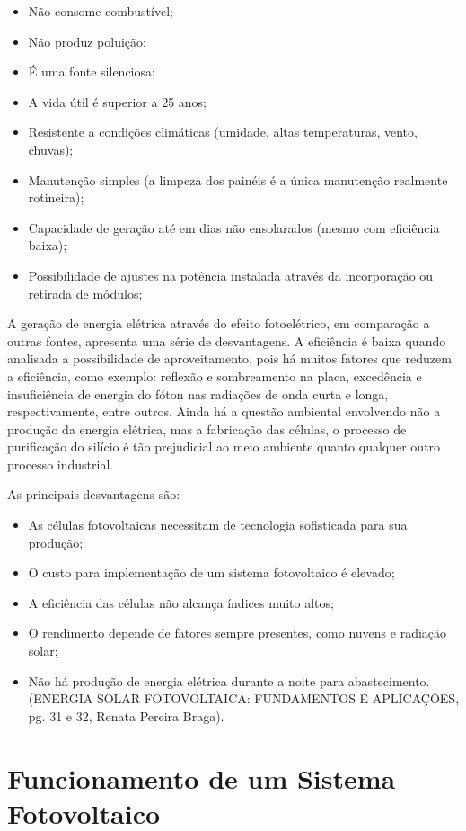\begin{itemize}
	\item Não consome combustível;
	\item Não produz poluição;
	\item É uma fonte silenciosa;
	\item A vida útil é superior a 25 anos;
	\item Resistente a condições climáticas (umidade, altas temperaturas, vento, chuvas);
	\item Manutenção simples (a limpeza dos painéis é a única manutenção realmente rotineira);
	\item Capacidade de geração até em dias não ensolarados (mesmo com eficiência baixa);
	\item Possibilidade de ajustes na potência instalada através da incorporação ou retirada de módulos;
\end{itemize}

A geração de energia elétrica através do efeito fotoelétrico, em comparação a outras fontes, apresenta uma série de desvantagens. A eficiência é baixa quando analisada a possibilidade de aproveitamento, pois há muitos fatores que reduzem a eficiência, como exemplo: reflexão e sombreamento na placa, excedência e insuficiência de energia do fóton nas radiações de onda curta e longa, respectivamente, entre outros. Ainda há a questão ambiental envolvendo não a produção da energia elétrica, mas a fabricação das células, o processo de purificação do silício é tão prejudicial ao meio ambiente quanto qualquer outro processo industrial.

As principais desvantagens são:

\begin{itemize}
	\item As células fotovoltaicas necessitam de tecnologia sofisticada para sua produção;
	\item O custo para implementação de um sistema fotovoltaico é elevado;
	\item A eficiência das células não alcança índices muito altos;
	\item O rendimento depende de fatores sempre presentes, como nuvens e radiação solar;
	\item Não há produção de energia elétrica durante a noite para abastecimento. (ENERGIA SOLAR FOTOVOLTAICA: FUNDAMENTOS E APLICAÇÕES, pg. 31 e 32, Renata Pereira Braga).

\end{itemize}

\section{Funcionamento de um Sistema Fotovoltaico}

